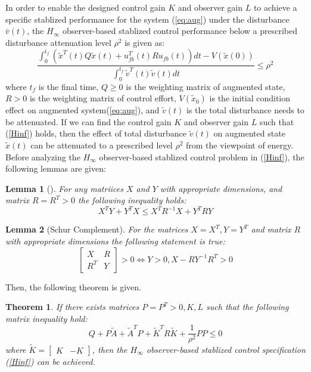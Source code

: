 \documentclass{ieeeaccess}
\newtheorem{theorem}{Theorem}
\newtheorem{lemma}{Lemma}
\begin{document}
In order to enable the designed control gain $K$ and observer gain $L$ to achieve a specific stablized performance for the system (\ref{eq:aug}) under the disturbance $\bar{v}(t)$, the $H_\infty$ observer-based stablized control performance below a prescribed disturbance attenuation level $\rho^2$ is given as:
\begin{equation} \label{Hinf}
        \frac{\int_{0}^{t_f}(\tilde{x}^T(t)Q\tilde{x}(t) + u_{fb}^T(t)Ru_{fb}(t))dt - V(\tilde{x}(0))}{\int_{0}^{t_f}\tilde{v}^T(t)\tilde{v}(t)dt}\leq \rho^2
\end{equation}
where $t_f$ is the final time, $Q \geq 0$ is the weighting matrix of augmented state, $R > 0$ is the weighting matrix of control effort, $V(\tilde{x}_0)$ is the initial condition effect on augmented system(\ref{eq:aug}), and $\tilde{v}(t)$ is the total disturbance needs to be attenuated. If we can find the control gain $K$ and observer gain $L$ such that (\ref{Hinf}) holds, then the effect of total disturbance $\tilde{v}(t)$ on augmented state $\tilde{x}(t)$ can be attenuated to a prescribed level $\rho^2$ from the viewpoint of energy. Before analyzing the $H_\infty$ observer-based stablized control problem in (\ref{Hinf}), the following lemmas are given:
\begin{lemma}[\cite{boyd1994linear}] \label{lemma1}
    For any matriices $X$ and $Y$ with appropriate dimensions, and matrix $R=R^T>0$ the following inequality holds:
    \begin{equation} \label{}
        X^T Y + Y^T X \leq X^T R^{-1}X + Y^T R Y
    \end{equation}  
\end{lemma}
\begin{lemma}[Schur Complement\cite{boyd1994linear}] \label{lemma2}
    For the matrices $X=X^T,Y=Y^T$ and matrix $R$ with appropriate dimensions the following statement is true:
    \begin{equation} \label{}
        \begin{bmatrix}
            X & R \\ R^T & Y 
        \end{bmatrix} > 0 \Leftrightarrow Y>0, X-RY^{-1}R^T>0
    \end{equation}
\end{lemma}
Then, the following theorem is given.
\begin{theorem} \label{theorem1}
    If there exists matrices $P=P^T>0, K,L$ such that the following matrix inequality hold:
    \begin{equation} \label{BMI1}
        Q + P\tilde{A} + \tilde{A}^T P + \tilde{K}^TR\tilde{K} + \frac{1}{\rho^2}PP \leq 0
    \end{equation}
    where $\tilde{K}=\begin{bmatrix}
        K & -K
    \end{bmatrix}$, then the $H_\infty$ observer-based stablized control specification (\ref{Hinf}) can be achieved.
\end{theorem}
\end{document}
